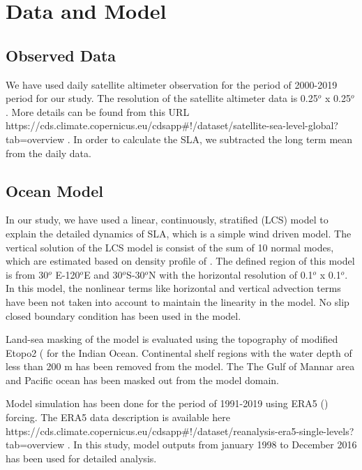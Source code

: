 \documentclass[review]{elsarticle}
\begin{document}
\section{Data and Model}
\subsection{Observed Data}
We have used daily satellite altimeter observation for the period of 2000-2019 period for our study. The resolution of the satellite altimeter data is 0.25$^o$ x 0.25$^o$. More details can be found from this URL https://cds.climate.copernicus.eu/cdsapp#!/dataset/satellite-sea-level-global?tab=overview . In order to calculate the SLA, we subtracted the long term mean from the daily data.

\subsection{Ocean Model}
In our study, we have used a linear, continuously, stratified (LCS) model to explain the detailed dynamics of SLA, which is a simple wind driven model. The vertical solution of the LCS model is consist of the sum of 10 normal modes, which are estimated based on density profile of \cite{moore1990excitation}. The defined region of this model is from 30$^o$ E-120$^o$E and 30$^o$S-30$^o$N with the horizontal resolution of 0.1$^o$ x 0.1$^o$. In this model, the nonlinear terms like horizontal and vertical advection terms have been not taken into account to maintain the linearity in the model. No slip closed boundary condition has been used in the model.

Land-sea masking of the model is evaluated using the topography of modified Etopo2 (\cite{sindhu2007improved} for the Indian Ocean. Continental shelf regions with the water depth of less than 200 m has been removed from the model. The The Gulf of Mannar area and Pacific ocean has been masked out from the model domain. 

Model simulation has been done for the period of 1991-2019 using ERA5 (\cite{hersbach2020era5}) forcing. The ERA5 data description is available here https://cds.climate.copernicus.eu/cdsapp#!/dataset/reanalysis-era5-single-levels?tab=overview . In this study, model outputs from january 1998 to December 2016 has been used for detailed analysis.
\end{document}
